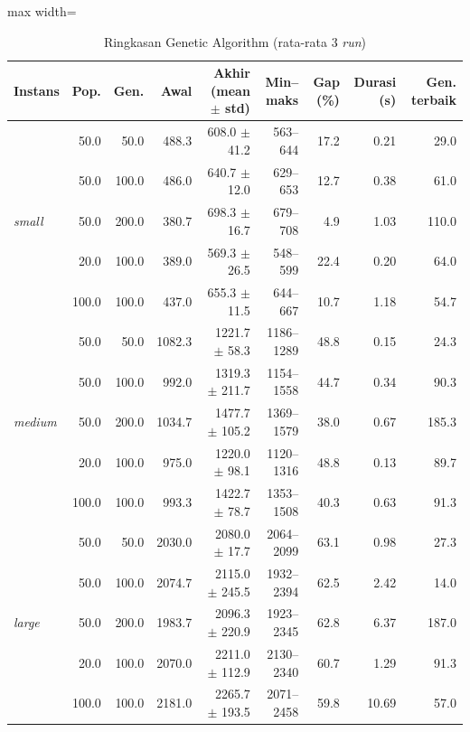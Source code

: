 \begin{table}[H]\centering\small
\caption{Ringkasan Genetic Algorithm (rata-rata 3 \textit{run})}\label{tab:ga-summary}
\begin{adjustbox}{max width=\textwidth}\begin{tabular}{l r r r r r r r r}
\toprule
\textbf{Instans} & \textbf{Pop.} & \textbf{Gen.} & \textbf{Awal} & \textbf{Akhir (mean $\pm$ std)} & \textbf{Min--maks} & \textbf{Gap (\%)} & \textbf{Durasi (s)} & \textbf{Gen. terbaik} \\
\midrule
\multirow{5}{*}{\textit{small}} & 50.0 & 50.0 & 488.3 & 608.0 $\pm$ 41.2 & 563--644 & 17.2 & 0.21 & 29.0 \\
 & 50.0 & 100.0 & 486.0 & 640.7 $\pm$ 12.0 & 629--653 & 12.7 & 0.38 & 61.0 \\
 & 50.0 & 200.0 & 380.7 & 698.3 $\pm$ 16.7 & 679--708 & 4.9 & 1.03 & 110.0 \\
 & 20.0 & 100.0 & 389.0 & 569.3 $\pm$ 26.5 & 548--599 & 22.4 & 0.20 & 64.0 \\
 & 100.0 & 100.0 & 437.0 & 655.3 $\pm$ 11.5 & 644--667 & 10.7 & 1.18 & 54.7 \\
\midrule
\multirow{5}{*}{\textit{medium}} & 50.0 & 50.0 & 1082.3 & 1221.7 $\pm$ 58.3 & 1186--1289 & 48.8 & 0.15 & 24.3 \\
 & 50.0 & 100.0 & 992.0 & 1319.3 $\pm$ 211.7 & 1154--1558 & 44.7 & 0.34 & 90.3 \\
 & 50.0 & 200.0 & 1034.7 & 1477.7 $\pm$ 105.2 & 1369--1579 & 38.0 & 0.67 & 185.3 \\
 & 20.0 & 100.0 & 975.0 & 1220.0 $\pm$ 98.1 & 1120--1316 & 48.8 & 0.13 & 89.7 \\
 & 100.0 & 100.0 & 993.3 & 1422.7 $\pm$ 78.7 & 1353--1508 & 40.3 & 0.63 & 91.3 \\
\midrule
\multirow{5}{*}{\textit{large}} & 50.0 & 50.0 & 2030.0 & 2080.0 $\pm$ 17.7 & 2064--2099 & 63.1 & 0.98 & 27.3 \\
 & 50.0 & 100.0 & 2074.7 & 2115.0 $\pm$ 245.5 & 1932--2394 & 62.5 & 2.42 & 14.0 \\
 & 50.0 & 200.0 & 1983.7 & 2096.3 $\pm$ 220.9 & 1923--2345 & 62.8 & 6.37 & 187.0 \\
 & 20.0 & 100.0 & 2070.0 & 2211.0 $\pm$ 112.9 & 2130--2340 & 60.7 & 1.29 & 91.3 \\
 & 100.0 & 100.0 & 2181.0 & 2265.7 $\pm$ 193.5 & 2071--2458 & 59.8 & 10.69 & 57.0 \\
\bottomrule
\end{tabular}\end{adjustbox}
\end{table}
